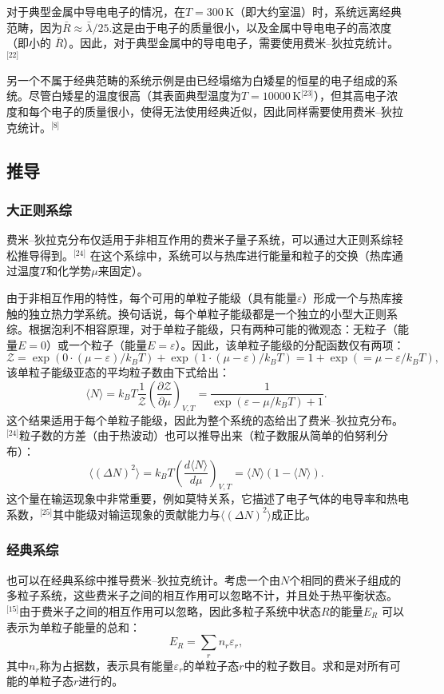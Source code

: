 对于典型金属中导电电子的情况，在\( T = 300 \, \text{K} \)（即大约室温）时，系统远离经典范畴，因为\(\bar{R}\approx\bar{\lambda}/25\).这是由于电子的质量很小，以及金属中导电电子的高浓度（即小的 \( \bar{R} \)）。因此，对于典型金属中的导电电子，需要使用费米–狄拉克统计。\(^\text{[22]}\)

另一个不属于经典范畴的系统示例是由已经塌缩为白矮星的恒星的电子组成的系统。尽管白矮星的温度很高（其表面典型温度为\( T = 10000 \, \text{K} \)\(^\text{[23]}\)），但其高电子浓度和每个电子的质量很小，使得无法使用经典近似，因此同样需要使用费米–狄拉克统计。\(^\text{[8]}\)
\subsection{推导} 
\subsubsection{大正则系综} 
费米–狄拉克分布仅适用于非相互作用的费米子量子系统，可以通过大正则系综轻松推导得到。\(^\text{[24]}\) 在这个系综中，系统可以与热库进行能量和粒子的交换（热库通过温度\(T\)和化学势\(\mu\)来固定）。

由于非相互作用的特性，每个可用的单粒子能级（具有能量\( \varepsilon\)）形成一个与热库接触的独立热力学系统。换句话说，每个单粒子能级都是一个独立的小型大正则系综。根据泡利不相容原理，对于单粒子能级，只有两种可能的微观态：无粒子（能量\(E = 0\)）或一个粒子（能量\(E = \varepsilon\)）。因此，该单粒子能级的分配函数仅有两项：
\[
\mathcal{Z} = \exp \left( 0 \cdot (\mu - \varepsilon) / k_B T \right) + \exp \left( 1 \cdot (\mu - \varepsilon) / k_B T \right) = 1 + \exp \left( =\mu - \varepsilon/k_B T \right),~
\]
该单粒子能级亚态的平均粒子数由下式给出：
\[
\langle N \rangle = k_B T \frac{1}{\mathcal{Z}} \left( \frac{\partial \mathcal{Z}}{\partial \mu} \right)_{V,T} = \frac{1}{\exp \left( \varepsilon - \mu/k_B T \right) + 1}.~
\]
这个结果适用于每个单粒子能级，因此为整个系统的态给出了费米–狄拉克分布。\(^\text{[24]}\)粒子数的方差（由于热波动）也可以推导出来（粒子数服从简单的伯努利分布）：
\[
\langle (\Delta N)^2 \rangle = k_B T \left( \frac{d \langle N \rangle}{d \mu} \right)_{V,T} = \langle N \rangle (1 - \langle N \rangle).~
\]
这个量在输运现象中非常重要，例如莫特关系，它描述了电子气体的电导率和热电系数，\(^\text{[25]}\)其中能级对输运现象的贡献能力与\( \langle (\Delta N)^2 \rangle \)成正比。
\subsubsection{经典系综} 
也可以在经典系综中推导费米–狄拉克统计。考虑一个由\(N\)个相同的费米子组成的多粒子系统，这些费米子之间的相互作用可以忽略不计，并且处于热平衡状态。\(^\text{[15]}\)由于费米子之间的相互作用可以忽略，因此多粒子系统中状态\(R\)的能量\(E_R\) 可以表示为单粒子能量的总和：
\[
E_R = \sum_r n_r \varepsilon_r,~
\]
其中\(n_r\)称为占据数，表示具有能量\(\varepsilon_r\)的单粒子态\(r\)中的粒子数目。求和是对所有可能的单粒子态\(r\)进行的。

